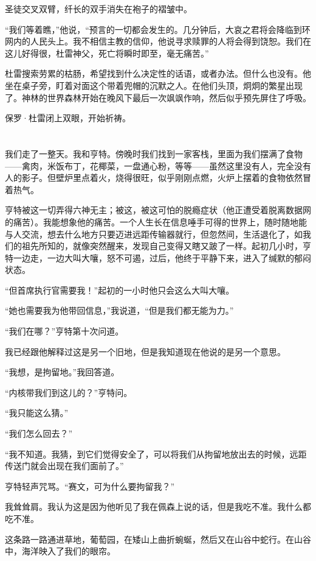 \documentclass[AutoFakeBold=true]{book}
\begin{document}
圣徒交叉双臂，纤长的双手消失在袍子的褶皱中。

``我们等着瞧，''他说，``预言的一切都会发生的。几分钟后，大哀之君将会降临到环网内的人民头上。我不相信主教的信仰，他说寻求赎罪的人将会得到饶恕。我们在这儿好得很，杜雷神父，死亡将瞬时即至，毫无痛苦。''

杜雷搜索劳累的枯肠，希望找到什么决定性的话语，或者办法。但什么也没有。他坐在桌子旁，盯着对面这个带着兜帽的沉默之人。在他们头顶，炯炯的繁星出现了。神林的世界森林开始在晚风下最后一次飒飒作响，然后似乎预先屏住了呼吸。

保罗·杜雷闭上双眼，开始祈祷。

\chapter{}

我们走了一整天。我和亨特。傍晚时我们找到一家客栈，里面为我们摆满了食物——禽肉，米饭布丁，花椰菜，一盘通心粉，等等——虽然这里没有人，完全没有人的影子。但壁炉里点着火，烧得很旺，似乎刚刚点燃，火炉上摆着的食物依然冒着热气。

亨特被这一切弄得六神无主；被这，被这可怕的脱瘾症状（他正遭受着脱离数据网的痛苦）。我能想象他的痛苦。一个人生长在信息唾手可得的世界上，随时随地能与人交流，想去什么地方只要迈进远距传输器就行，但忽然间，生活退化了，如我们的祖先所知的，就像突然醒来，发现自己变得又瞎又跛了一样。起初几小时，亨特一边走，一边大叫大嚷，怒不可遏，过后，他终于平静下来，进入了缄默的郁闷状态。

``但首席执行官需要我！''起初的一小时他只会这么大叫大嚷。

``她也需要我为他带回信息，''我说道，``但是我们都无能为力。''

``我们在哪？''亨特第十次问道。

我已经跟他解释过这是另一个旧地，但是我知道现在他说的是另一个意思。

``我想，是拘留地。''我回答道。

``内核带我们到这儿的？''亨特问。

``我只能这么猜。''

``我们怎么回去？''

``我不知道。我猜，到它们觉得安全了，可以将我们从拘留地放出去的时候，远距传送门就会出现在我们面前了。''

亨特轻声咒骂。``赛文，可为什么要拘留我？''

我耸耸肩。我认为这是因为他听见了我在佩森上说的话，但是我吃不准。我什么都吃不准。

这条路一路通进草地，葡萄园，在矮山上曲折蜿蜒，然后又在山谷中蛇行。在山谷中，海洋映入了我们的眼帘。
\end{document}
